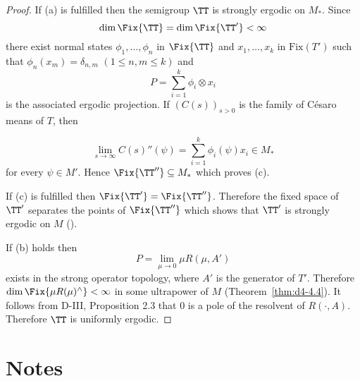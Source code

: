 \begin{proof}
If (a) is fulfilled then the semigroup $ \TT $  is strongly ergodic on $ M_{*} $.
Since
\[
\dim \Fix{\TT} = \dim \Fix{\TT'} < \infty
\]
there exist normal states $ \phi_{1},\ldots,\phi_{n} $  in $ \Fix{\TT} $  and $ x_{1},\ldots,x_{k} $  in $ \text{Fix}(T') $  such that $ \phi_{n}(x_{m}) = \delta_{n,m} $  $ (1 \leq n, m \leq k) $  and
\[
P = \sum_{i=1}^{k} \phi_{i} \otimes x_{i}
\]
is the associated ergodic projection.
If $ (C(s))_{s>0} $  is the family of Césaro means of $ T $, then
%

\[
\lim_{s \to \infty} C(s)''(\psi) = \sum_{i=1}^{k} \phi_{i}(\psi)x_{i} \in M_{*}
\]
for every $ \psi \in M' $.
Hence $ \Fix{\TT''} \subseteq M_{*} $  which proves (c).

If (c) is fulfilled then $ \Fix{\TT'} = \Fix{\TT''} $.
Therefore the fixed space of $ \TT' $  separates the points of $ \Fix{\TT''} $  which shows that $ \TT' $  is strongly ergodic on $ M $  (\citet[Chap.2, Thm.1.4]{krengel:1985}).

If (b) holds then
\[
P = \lim_{\mu \to 0} \mu R(\mu,A')
\]
exists in the strong operator topology, where $ A' $  is the generator of $ T' $.
Therefore $ \dim \Fix{\mu R(\mu)^{\wedge}} < \infty $  in some ultrapower of $ M $  (Theorem~\ref{thm:d4-4.4}).
It follows from D-III, Proposition 2.3 that 0 is a pole of the resolvent of $ R(\cdot,A) $.
Therefore $ \TT $  is uniformly ergodic.
\end{proof}
\section*{Notes}\label{notes:d4-notes}

